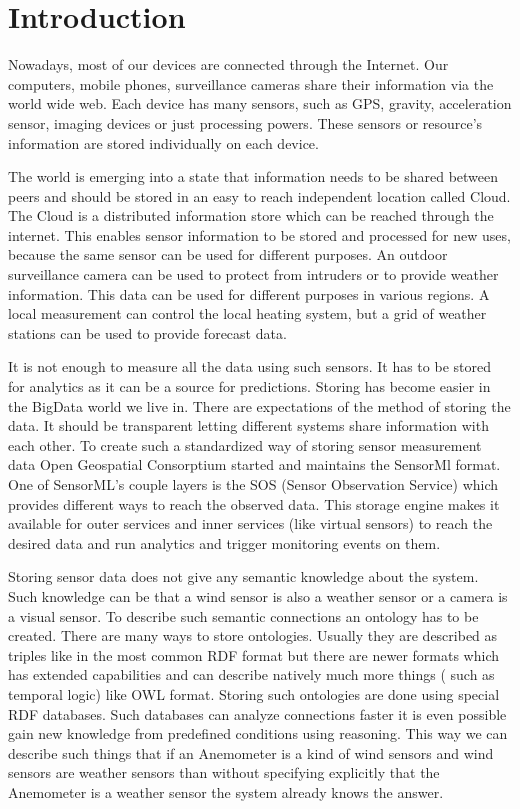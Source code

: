 \chapter*{Introduction}

Nowadays, most of our devices are connected through the Internet. Our computers, mobile phones, surveillance cameras share their information via the world wide web. Each device has many sensors, such as GPS, gravity, acceleration sensor, imaging devices or just processing powers. These sensors or resource's information are stored individually on each device. 

The world is emerging into a state that information needs to be shared between peers and should be stored in an easy to reach independent location called Cloud. The Cloud is a distributed information store which can be reached through the internet.
This enables sensor information to be stored and processed for new uses, because the same sensor can be used for different purposes. An outdoor surveillance camera can be used to protect from intruders or to provide weather information. This data can be used for different purposes in various regions. A local measurement can control the local heating system, but a grid of weather stations can be used to provide forecast data.
 
 It is not enough to measure all the data using such sensors. It has to be stored for analytics as it can be a source for predictions. Storing has become easier in the BigData world we live in. There are expectations of the method of storing the data. It should be transparent letting different systems share information with each other. To create such a standardized way of storing sensor measurement data Open Geospatial Consorptium started and maintains the SensorMl format. One of SensorML's couple layers is the SOS (Sensor Observation Service) which provides different ways to reach the observed data. This storage engine makes it available for outer services and inner services (like virtual sensors) to reach the desired data and run analytics and trigger monitoring events on them.

Storing sensor data does not give any semantic knowledge about the system. Such knowledge can be that a wind sensor is also a weather sensor or a camera is a visual sensor. To describe such semantic connections an ontology has to be created. There are many ways to store ontologies. Usually they are described as triples like in the most common RDF format but there are newer formats which has extended capabilities and can describe natively much more things ( such as temporal logic) like OWL format. Storing such ontologies are done using special RDF databases. Such databases can analyze connections faster it is even possible gain new knowledge from predefined conditions using reasoning. This way we can describe such things that if an Anemometer is a kind of wind sensors and wind sensors are weather sensors than without specifying explicitly that the Anemometer is a weather sensor the system already knows the answer. 

